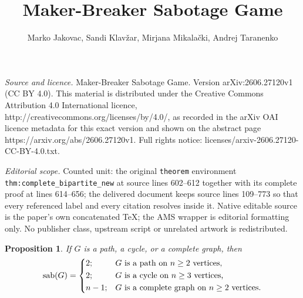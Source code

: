 \documentclass[10pt,a4paper]{amsart}
\newtheorem{proposition}[theorem]{Proposition}
\DeclareMathOperator{\sab}{\mathrm{sab}}
\begin{document}
\title[Maker-Breaker Sabotage Game]{Maker-Breaker Sabotage Game}
\author{Marko Jakovac, Sandi Klavžar, Mirjana Mikalački, Andrej Taranenko}
\date{}
\maketitle
\noindent\emph{Source and licence.} Maker-Breaker Sabotage Game. Version arXiv:2606.27120v1 (CC BY 4.0). This material is distributed under the Creative Commons Attribution 4.0 International licence, http://creativecommons.org/licenses/by/4.0/, as recorded in the arXiv OAI licence metadata for this exact version and shown on the abstract page https://arxiv.org/abs/2606.27120v1. Full rights notice: licenses/arxiv-2606.27120-CC-BY-4.0.txt.\par\smallskip
\noindent\textit{Editorial scope.} Counted unit: the original \texttt{theorem} environment \texttt{thm:complete\_bipartite\_new} at source lines 602--612 together with its complete proof at lines 614--656; the delivered document keeps source lines 109--773 so that every referenced label and every citation resolves inside it. Native editable source is the paper's own concatenated TeX; the AMS wrapper is editorial formatting only. No publisher class, upstream script or unrelated artwork is redistributed.
\begin{proposition}\label{prp:path-cycle-complete}
If $G$ is a path, a cycle, or a complete graph, then 
\[
\sab(G) = \begin{dcases}
            2; & G \text{ is a path on } n\geq 2 \text{ vertices,} \\
            2; & G \text{ is a cycle on } n\geq 3 \text{ vertices,} \\
            n-1; & G \text{ is a complete graph on } n\geq 2 \text{ vertices.} \\
          \end{dcases}
\]
\end{proposition}
\end{document}
